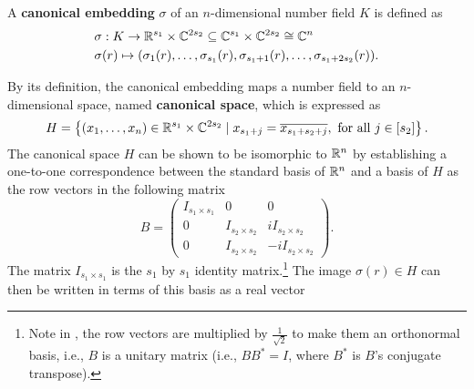 \documentclass[../main.tex]{subfiles}
\begin{document}
\begin{definition}
	\label{def:canEmbd}
	\reversemarginpar
	A \textbf{canonical embedding} $\sigma$ of an $n$-dimensional number field $K$ is defined as 
	\begin{align}
	\label{eq:canEmbed1}
	&\sigma: K \rightarrow \mathbb{R}^{s_1} \times \mathbb{C}^{2s_2} \subseteq \mathbb{C}^{s_1}\times \mathbb{C}^{2s_2} \cong \mathbb{C}^n \nonumber \\
	&\sigma(r) \mapsto (\sigma_1(r), \dots, \sigma_{s_1}(r), \sigma_{s_1+1}(r),\dots, \sigma_{s_1+2s_2}(r)).
	\end{align}
\end{definition}

By its definition, the canonical embedding maps a number field to an $n$-dimensional space, 
\reversemarginpar
{}
named \textbf{canonical space}, which is expressed as  
\begin{equation*}
H = \left\{(x_1, \dots, x_n) \in \mathbb{R}^{s_1} \times \mathbb{C}^{2s_2} \mid x_{s_1 + j} = \overline{x_{s_1 + s_2 + j}}, \text{ for all } j \in [s_2]\right\}.   
\end{equation*}
The canonical space $H$ can be shown to be isomorphic to $\mathbb{R}^n$ by establishing a one-to-one correspondence between the standard basis of $\mathbb{R}^n$ and a basis of $H$ as the row vectors in the following matrix
\begin{equation*}
\label{eq:basisMtxForH}
B = \left(
    \begin{matrix}
    I_{s_1\times s_1} & 0 & 0 \\
    0 & I_{s_2 \times s_2} & iI_{s_2 \times s_2} \\
    0 & I_{s_2 \times s_2} & -iI_{s_2 \times s_2}
    \end{matrix}
\right).
\end{equation*}
The matrix $I_{s_1 \times s_1}$ is the $s_1$ by $s_1$ identity matrix.\footnote{Note in \cite{lyubashevsky2010ideal}, the row vectors are multiplied by $\frac{1}{\sqrt{2}}$ to make them an orthonormal basis, i.e., $B$ is a unitary matrix (i.e., $BB^*=I$, where $B^*$ is $B$'s conjugate transpose).} The image $\sigma(r) \in H$ can then be written in terms of this basis as a real vector 
\end{document}
